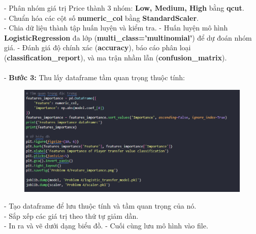 \documentclass[12pt, letterpaper]{article}
\begin{document}
- Phân nhóm giá trị Price thành 3 nhóm: \textbf{Low, Medium, High} bằng \textbf{qcut}.\\
- Chuẩn hóa các cột số \textbf{numeric\_col} bằng \textbf{StandardScaler}.\\
- Chia dữ liệu thành tập huấn luyện và kiểm tra.
- Huấn luyện mô hình \textbf{LogisticRegression} đa lớp (\textbf{multi\_class='multinomial'}) để dự đoán nhóm giá.
- Đánh giá độ chính xác (\textbf{accuracy}), báo cáo phân loại (\textbf{classification\_report}), và ma trận nhầm lẫn (\textbf{confusion\_matrix}).\\\\
- \textbf{Bước 3:} Thu lấy dataframe tầm quan trọng thuộc tính:
\begin{figure}[H]
    \centering
    \includegraphics[width=1\linewidth]{img/4_2-3.png}
\end{figure}
- Tạo dataframe để lưu thuộc tính và tầm quan trọng của nó.\\
- Sắp xếp các giá trị theo thứ tự giảm dần.\\
- In ra và vẽ dưới dạng biểu đồ.
- Cuối cùng lưu mô hình vào file.
\end{document}

